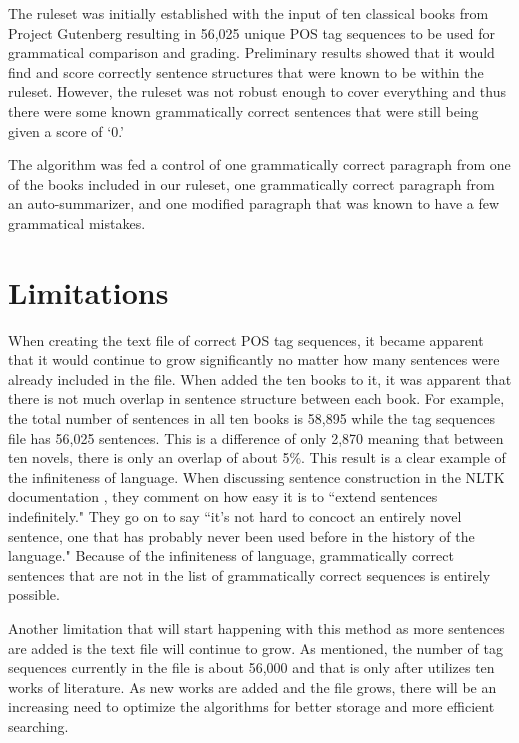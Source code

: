 \documentclass[11pt,a4paper]{article}
\begin{document}
\begin{multicols}{2}
The ruleset was initially established with the input of ten classical books from Project Gutenberg resulting in 56,025 unique POS tag sequences to be used for grammatical comparison and grading. Preliminary results showed that it would find and score correctly sentence structures that were known to be within the ruleset. However, the ruleset was not robust enough to cover everything and thus there were some known grammatically correct sentences that were still being given a score of `0.'

The algorithm was fed a control of one grammatically correct paragraph from one of the books included in our ruleset, one grammatically correct paragraph from an auto-summarizer, and one modified paragraph that was known to have a few grammatical mistakes.


\section{Limitations}
When creating the text file of correct POS tag sequences, it became apparent that it would continue to grow significantly no matter how many sentences were already included in the file. When added the ten books to it, it was apparent that there is not much overlap in sentence structure between each book. For example, the total number of sentences in all ten books is 58,895 while the tag sequences file has 56,025 sentences. This is a difference of only 2,870 meaning that between ten novels, there is only an overlap of about 5\%. This result is a clear example of the infiniteness of language. When discussing sentence construction in the NLTK documentation \cite{nltk}, they comment on how easy it is to ``extend sentences indefinitely." They go on to say ``it's not hard to concoct an entirely novel sentence, one that has probably never been used before in the history of the language." Because of the infiniteness of language, grammatically correct sentences that are not in the list of grammatically correct sequences is entirely possible.

Another limitation that will start happening with this method as more sentences are added is the text file will continue to grow. As mentioned, the number of tag sequences currently in the file is about 56,000 and that is only after utilizes ten works of literature. As new works are added and the file grows, there will be an increasing need to optimize the algorithms for better storage and more efficient searching.


\end{multicols}
\end{document}
